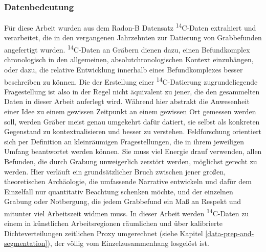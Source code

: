 \documentclass[openany,twoside,twocolumn]{book}
\begin{document}
\hypertarget{datenbedeutung}{%
\subsubsection{Datenbedeutung}\label{datenbedeutung}}

Für diese Arbeit wurden aus dem Radon-B Datensatz
\textsuperscript{14}C-Daten extrahiert und verarbeitet, die in den
vergangenen Jahrzehnten zur Datierung von Grabbefunden angefertigt
wurden. \textsuperscript{14}C-Daten an Gräbern dienen dazu, einen
Befundkomplex chronologisch in den allgemeinen, absolutchronologischen
Kontext einzuhängen, oder dazu, die relative Entwicklung innerhalb eines
Befundkomplexes besser beschreiben zu können. Die der Erstellung einer
\textsuperscript{14}C-Datierung zugrundeliegende Fragestellung ist also
in der Regel nicht äquivalent zu jener, die den gesammelten Daten in
dieser Arbeit auferlegt wird. Während hier abstrakt die Anwesenheit
einer Idee zu einem gewissen Zeitpunkt an einem gewissen Ort gemessen
werden soll, werden Gräber meist genau umgekehrt dafür datiert, sie
selbst als konkreten Gegenstand zu kontextualisieren und besser zu
verstehen. Feldforschung orientiert sich per Definition an kleinräumigen
Fragestellungen, die in ihrem jeweiligen Umfang beantwortet werden
können. Sie muss viel Energie drauf verwenden, allen Befunden, die durch
Grabung unweigerlich zerstört werden, möglichst gerecht zu werden. Hier
verläuft ein grundsätzlicher Bruch zwischen jener großen, theoretischen
Archäologie, die umfassende Narrative entwickeln und dafür dem
Einzelfall nur quantitativ Beachtung schenken möchte, und der einzelnen
Grabung oder Notbergung, die jedem Grabbefund ein Maß an Respekt und
mitunter viel Arbeitszeit widmen muss. In dieser Arbeit werden
\textsuperscript{14}C-Daten zu einem in künstlichen Arbeitsregionen
räumlichen und über kalibrierte Dichteverteilungen zeitlichen Proxy
umgerechnet (siehe Kapitel \ref{data-prep-and-segmentation}), der völlig
vom Einzelzusammenhang losgelöst ist.
\end{document}
